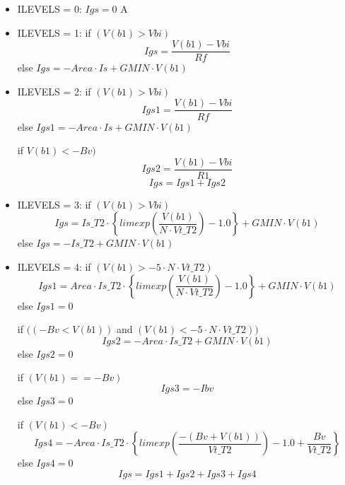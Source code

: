 \begin{itemize}
 \item ILEVELS = 0: $Igs = 0$ A
 \item ILEVELS = 1: 
if $(V(b1)>Vbi)$ 
\begin{equation} Igs = \dfrac{V(b1)-Vbi}{Rf}  \end{equation}
else \hspace{50mm} $Igs = -Area \cdot Is +GMIN \cdot V(b1)$ 
 \item ILEVELS = 2: 
if $(V(b1) > Vbi)$
\begin{equation} Igs1 = \dfrac{V(b1)-Vbi}{Rf}  \end{equation}
else \hspace{50mm}$Igs1 = -Area \cdot Is +GMIN \cdot V(b1)$


if $V(b1) < -Bv)$
\begin{equation} Igs2 = \dfrac{V(b1)-Vbi}{R1}  \end{equation}
\begin{equation} Igs = Igs1 + Igs2  \end{equation}
 \item  ILEVELS = 3: 
if $(V(b1) >Vbi) $
\begin{equation} Igs = Is\_T2 \cdot \left\lbrace  limexp\left(  \frac{V(b1)}{N \cdot Vt\_T2}\right) -1.0\right\rbrace   + GMIN \cdot V(b1)   \end{equation}
else \hspace{13mm}$Igs = -Is\_T2 + GMIN\cdot V(b1)$ 

 \item  ILEVELS = 4: 
if $(V(b1) > -5 \cdot N \cdot Vt\_T2)$
\begin{equation} 
Igs1 = Area \cdot Is\_T2 \cdot \left\lbrace limexp\left( \frac{V(b1)}{N \cdot Vt\_T2}\right)  -1.0 \right\rbrace  + GMIN \cdot V(b1)
 \end{equation}
 else \hspace{5mm} $Igs1 = 0$


if $( (-Bv < V(b1)) $ and $ (V(b1) < -5\cdot N \cdot Vt\_T2))$
\begin{equation} Igs2 = -Area \cdot Is\_T2 + GMIN \cdot V(b1)  \end{equation}
else  \hspace{31mm}$Igs2 = 0$


if $(V(b1) == -Bv)$
\begin{equation} Igs3 = -Ibv \end{equation}
else  \hspace{56mm}$Igs3 = 0$


if $(V(b1) < -Bv)$
\begin{equation} Igs4 = -Area \cdot Is\_T2 \cdot \left\lbrace limexp\left( \frac{-(Bv+V(b1))}{Vt\_T2}\right)  -1.0 + \frac{Bv}{Vt\_T2}\right\rbrace  \end{equation}
else \hspace{5mm}$Igs4 = 0$
\begin{equation} Igs = Igs1 + Igs2 + Igs3 + Igs4  \end{equation}
\end{itemize}

